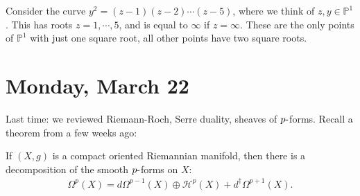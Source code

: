 \begin{example}[?]

Consider the curve \(y^2 = (z-1)(z-2)\cdots (z-5)\), where we think of
\(z, y\in {\mathbb{P}}^1\). This has roots \(z=1,\cdots, 5\), and is
equal to \(\infty\) if \(z=\infty\). These are the only points of
\({\mathbb{P}}^1\) with just one square root, all other points have two
square roots.

\begin{figure}
\centering
{}
\end{figure}

\begin{figure}
\centering
{}
\end{figure}

\end{example}

\hypertarget{monday-march-22}{%
\section{Monday, March 22}\label{monday-march-22}}

\begin{remark}

Last time: we reviewed Riemann-Roch, Serre duality, sheaves of
\(p{\hbox{-}}\)forms. Recall a theorem from a few weeks ago:

\end{remark}

\begin{theorem}

If \((X,g)\) is a compact oriented Riemannian manifold, then there is a
decomposition of the smooth \(p{\hbox{-}}\)forms on \(X\):
\begin{align*}
\Omega^p(X) = d \Omega^{p-1}(X) \oplus {\mathcal{H}}^p(X) + d^\dagger \Omega^{p+1}(X)
.\end{align*}

\end{theorem}

